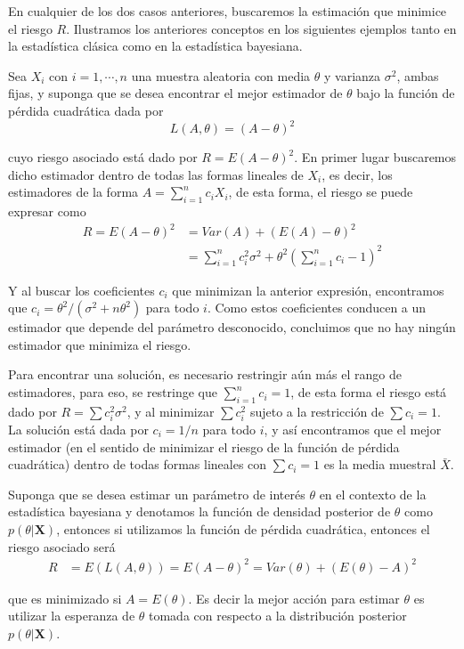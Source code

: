 En cualquier de los dos casos anteriores, buscaremos la estimación que minimice el riesgo $R$. Ilustramos los anteriores conceptos en los siguientes ejemplos tanto en la estadística clásica como en la estadística bayesiana.

\begin{Eje}
Sea $X_i$ con $i=1,\cdots, n$ una muestra aleatoria con media $\theta$ y varianza $\sigma^2$, ambas fijas, y suponga que se desea encontrar el mejor estimador de $\theta$ bajo la función de pérdida cuadrática dada por
\begin{equation*}
L(A,\theta)=(A-\theta)^2
\end{equation*}

cuyo riesgo asociado está dado por $R=E(A-\theta)^2$. En primer lugar buscaremos dicho estimador dentro de todas las formas lineales de $X_i$, es decir, los estimadores de la forma $A=\sum_{i=1}^nc_iX_i$, de esta forma, el riesgo se puede expresar como
\begin{align*}
R=E(A-\theta)^2&=Var(A)+(E(A)-\theta)^2\\
&=\sum_{i=1}^nc_i^2\sigma^2+\theta^2(\sum_{i=1}^nc_i-1)^2
\end{align*}

Y al buscar los coeficientes $c_i$ que minimizan la anterior expresión, encontramos que $c_i=\theta^2/(\sigma^2+n\theta^2)$ para todo $i$. Como estos coeficientes conducen a un estimador que depende del parámetro desconocido, concluimos que no hay ningún estimador que minimiza el riesgo.

Para encontrar una solución, es necesario restringir aún más el rango de estimadores, para eso, se restringe que $\sum_{i=1}^nc_i=1$, de esta forma el riesgo está dado por $R=\sum c_i^2\sigma^2$, y al minimizar $\sum c_i^2$ sujeto a la restricción de $\sum c_i=1$. La solución está dada por $c_i=1/n$ para todo $i$, y así encontramos que el mejor estimador (en el sentido de minimizar el riesgo de la función de pérdida cuadrática) dentro de todas formas lineales con $\sum c_i=1$ es la media muestral $\bar{X}$.
\end{Eje}

\begin{Eje}
Suponga que se desea estimar un parámetro de interés $\theta$ en el contexto de la estadística bayesiana y denotamos la función de densidad posterior de $\theta$ como $p(\theta|\mathbf{X})$, entonces si utilizamos la función de pérdida cuadrática, entonces el riesgo asociado será
\begin{align*}
R&=E(L(A,\theta))=E (A-\theta)^2=Var(\theta)+(E(\theta)-A)^2
\end{align*}

que es minimizado si $A=E(\theta)$. Es decir la mejor acción para estimar $\theta$ es utilizar la esperanza de $\theta$ tomada con respecto a la distribución posterior $p(\theta|\mathbf{X})$.
\end{Eje}

